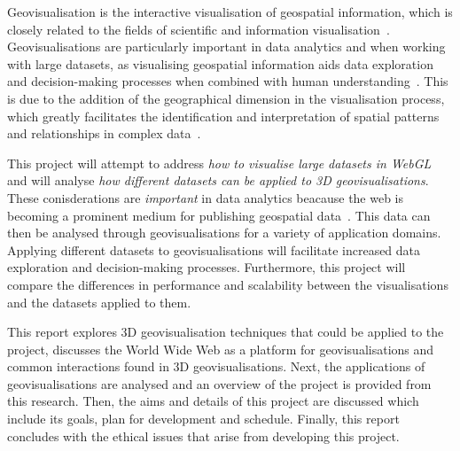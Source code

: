 Geovisualisation is the interactive visualisation of geospatial information, which is closely related to the fields of scientific and information visualisation~\parencite{jiang2005geovisualization}. Geovisualisations are particularly important in data analytics and when working with large datasets, as visualising geospatial information aids data exploration and decision-making processes when combined with human understanding~\parencite{grinstein2002introduction, hendley1995case}. This is due to the addition of the geographical dimension in the visualisation process, which greatly facilitates the identification and interpretation of spatial patterns and relationships in complex data~\parencite{kwan2004geovisualization}.

This project will attempt to address \emph{how to visualise large datasets in WebGL} and will analyse \emph{how different datasets can be applied to 3D geovisualisations}. These conisderations are \emph{important} in data analytics beacause the web is becoming a prominent medium for publishing geospatial data~\parencite{maceachren2004geovisualization}. This data can then be analysed through geovisualisations for a variety of application domains. Applying different datasets to geovisualisations will facilitate increased data exploration and decision-making processes. Furthermore, this project will compare the differences in performance and scalability between the visualisations and the datasets applied to them.

This report explores 3D geovisualisation techniques that could be applied to the project, discusses the World Wide Web as a platform for geovisualisations and common interactions found in 3D geovisualisations. Next, the applications of geovisualisations are analysed and an overview of the project is provided from this research. Then, the aims and details of this project are discussed which include its goals, plan for development and schedule. Finally, this report concludes with the ethical issues that arise from developing this project.

